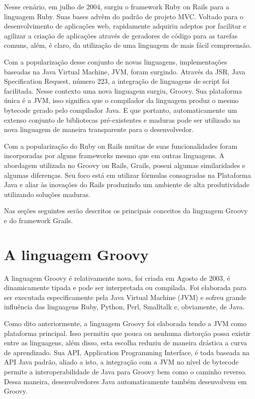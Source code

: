 \documentclass[12pt]{article}
\begin{document}
    Nesse cenário, em julho de 2004, surgiu o framework Ruby on Rails 
    para a linguagem Ruby. Suas bases advêm do padrão de projeto MVC. Voltado 
    para o desenvolvimento de aplicações web, rapidamente adquiriu adeptos por 
    facilitar e agilizar a criação de aplicações através de geradores de código 
    para as tarefas comuns, além, é claro, da utilização de uma linguagem de mais 
    fácil compreensão.

    Com a popularização desse conjunto de novas linguagens, implementações 
    baseadas na Java Virtual Machine, JVM, foram surgindo. Através da JSR, Java 
    Specification Request, número 223, a integração de linguagens de script foi 
    facilitada. Nesse contexto uma nova linguagem surgiu, Groovy. Sua plataforma 
    única é a JVM, isso significa que o compilador da linguagem produz o mesmo
    bytecode gerado pelo compilador Java. E que portanto, automaticamente um 
    extenso conjunto de bibliotecas pré-existentes e maduras pode ser utilizado 
    na nova linguagem de maneira transparente para o desenvolvedor. 
    
    Com a popularização do Ruby on Rails muitas de suas funcionalidades foram 
    incorporadas por alguns frameworks mesmo que em outras linguagens. A 
    abordagem utilizada no Groovy on Rails, Grails, possui algumas similaridades 
    e algumas diferenças. Seu foco está em utilizar fórmulas consagradas na 
    Plataforma Java e aliar às inovações do Rails produzindo um ambiente de alta 
    produtividade utilizando soluções maduras.
    
    Nas seções seguintes serão descritos os principais conceitos da linguagem 
    Groovy e do framework Grails.

\section{A linguagem Groovy} \label{sec:linguagem_groovy}

    A linguagem Groovy é relativamente nova, foi criada em  Agosto de 2003, é 
    dinamicamente tipada e pode ser interpretada ou compilada. Foi elaborada 
    para ser executada especificamente pela Java Virtual Machine (JVM) e sofreu 
    grande influência das linguagens Ruby, Python, Perl, Smalltalk e, obviamente, 
    de Java.
    
    Como dito anteriormente, a linguagem Groovy foi elaborada tendo a JVM como 
    plataforma principal. Isso permitiu que pouca ou nenhuma distorção possa 
    existir entre as linguagens, além disso, esta escolha reduziu de maneira 
    drástica a curva de aprendizado. Sua API, Application Programming Interface, 
    é toda baseada na API Java padrão, aliado a isto, a integração com a JVM no 
    nível de bytecode permite a interoperabilidade de Java para Groovy bem como 
    o caminho reverso. Dessa maneira, desenvolvedores Java automaticamente 
    também desenvolvem em Groovy.
    
\end{document}
